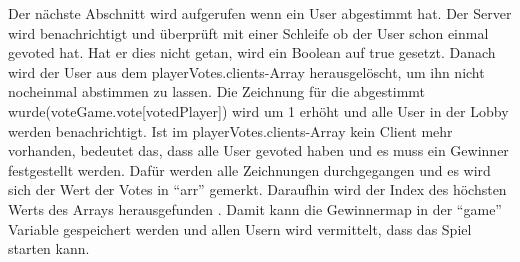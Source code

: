 Der nächste Abschnitt wird aufgerufen wenn ein User abgestimmt hat. Der Server wird benachrichtigt und überprüft mit einer Schleife ob der User
schon einmal gevoted hat. Hat er dies nicht getan, wird ein Boolean auf true gesetzt.
Danach wird der User aus dem playerVotes.clients-Array herausgelöscht, um ihn nicht nocheinmal abstimmen zu lassen. Die Zeichnung für die abgestimmt wurde(voteGame.vote[votedPlayer]) wird um 1 erhöht und alle User in der Lobby werden benachrichtigt.
Ist im playerVotes.clients-Array kein Client mehr vorhanden, bedeutet das, dass alle User gevoted haben und es muss ein Gewinner festgestellt werden.
Dafür werden alle Zeichnungen durchgegangen und es wird sich der Wert der Votes in ``arr'' gemerkt. Daraufhin wird der Index des höchsten Werts des Arrays herausgefunden \cite{indexOfMax}. 
Damit kann die Gewinnermap in der ``game'' Variable gespeichert werden und allen Usern wird vermittelt, dass das Spiel starten kann.

